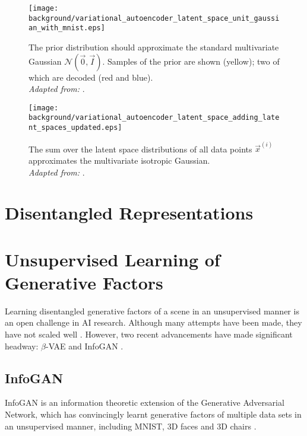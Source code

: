 \begin{figure}[h!]
\centering
\captionsetup{justification=centering}
\texttt{[image: background/variational\_autoencoder\_latent\_space\_unit\_gaussian\_with\_mnist.eps]}
\caption{The prior distribution should approximate the standard multivariate Gaussian $\mathcal{N}(\vec{0}, \vec{I})$. Samples of the prior are shown (yellow); two of which are decoded (red and blue).\\ \textit{Adapted from:} \cite{Dykeman2016}.}
\label{fig:variational_autoencoder_latent_space_unit_gaussian_with_mnist}
\end{figure}

\begin{landscape}
\begin{figure}[h!]
\centering
\captionsetup{justification=centering}
\texttt{[image: background/variational\_autoencoder\_latent\_space\_adding\_latent\_spaces\_updated.eps]}
\caption{The sum over the latent space distributions of all data points $\vec{x}^{(i)}$ approximates the multivariate isotropic Gaussian. \\ \textit{Adapted from:} \cite{Dykeman2016}.}
\label{fig:variational_autoencoder_latent_space_adding_latent_spaces_updated}
\end{figure}
\end{landscape}



%
%
%
%
%
\section{Disentangled Representations}
\cite{Higgins2016, Thiagarajan2016}





%
%
%
%
%
\section{Unsupervised Learning of Generative Factors}
Learning disentangled generative factors of a scene in an unsupervised manner is an open challenge in AI research. Although many attempts have been made, they have not scaled well \cite{Thiagarajan2016, Schmidhuber1992, Desjardins2012, Tang2013, Cohen2014}. However, two recent advancements have made significant headway: $\beta$-VAE and InfoGAN \cite{Chen2016, Thiagarajan2016}.

\subsection{InfoGAN}
InfoGAN is an information theoretic extension of the Generative Adversarial Network, which has convincingly learnt generative factors of multiple data sets in an unsupervised manner, including MNIST, 3D faces and 3D chairs \cite{Chen2016}.

